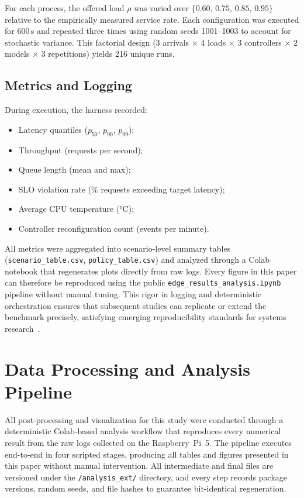 \documentclass[acmsmall]{acmart}
\begin{document}
For each process, the offered load $\rho$ was varied over $\{0.60,\,0.75,\,0.85,\,0.95\}$ relative to the empirically measured service rate.  
Each configuration was executed for 600\,s and repeated three times using random seeds 1001–1003 to account for stochastic variance.  
This factorial design ($3$ arrivals × $4$ loads × $3$ controllers × $2$ models × $3$ repetitions) yields 216 unique runs.

\subsection{Metrics and Logging}

During execution, the harness recorded:

\begin{itemize}
  \item Latency quantiles ($p_{50}$, $p_{90}$, $p_{99}$);
  \item Throughput (requests per second);
  \item Queue length (mean and max);
  \item SLO violation rate (\% requests exceeding target latency);
  \item Average CPU temperature (°C);
  \item Controller reconfiguration count (events per minute).
\end{itemize}

All metrics were aggregated into scenario-level summary tables (\texttt{scenario\_table.csv}, \texttt{policy\_table.csv}) and analyzed through a Colab notebook that regenerates plots directly from raw logs.  
Every figure in this paper can therefore be reproduced using the public \texttt{edge\_results\_analysis.ipynb} pipeline without manual tuning.  
This rigor in logging and deterministic orchestration ensures that subsequent studies can replicate or extend the benchmark precisely, satisfying emerging reproducibility standards for systems research~\cite{reddi2020mlperf,sze2017efficient,raspberrypi2023product}.

\section{Data Processing and Analysis Pipeline}

All post-processing and visualization for this study were conducted through a deterministic Colab-based analysis workflow that reproduces every numerical result from the raw logs collected on the Raspberry~Pi~5.  
The pipeline executes end-to-end in four scripted stages, producing all tables and figures presented in this paper without manual intervention.  
All intermediate and final files are versioned under the \texttt{/analysis\_ext/} directory, and every step records package versions, random seeds, and file hashes to guarantee bit-identical regeneration.
\end{document}
